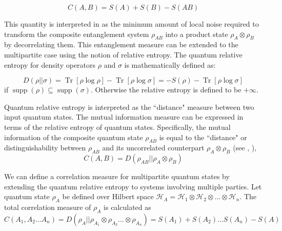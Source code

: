 \documentclass{article}
\DeclareMathOperator{\Tr}{Tr}
\newcommand{\brackets}[1]{\left[ #1 \right]}
\newcommand{\trace}[1]{\Tr \brackets{ #1 }}
\newcommand{\hilb}{\mathcal{H}}
\DeclareMathOperator{\supp}{supp}
\begin{document}
\begin{equation}
\label{eq:total_correlation_bipartite}
C(A, B) = S(A) + S(B) - S(AB)
\end{equation}

This quantity is interpreted in \cite{wintercorrelations} as the minimum amount of local noise required to transform the composite entanglement system $\rho_{AB}$ into a product state $\rho_A \otimes \rho_B$ by decorrelating them. This entanglement measure can be extended to the multipartite case using the notion of relative entropy. The quantum relative entropy for density operators $\rho$ and $\sigma$ is mathematically defined as:

\begin{equation}
\label{eq:relative_entropy}
D(\rho || \sigma) = \trace{\rho \log \rho} - \trace{\rho \log \sigma} = -S(\rho) - \trace{\rho \log \sigma} 
\end{equation}
if $\supp(\rho) \subseteq \supp(\sigma)$. Otherwise the relative entropy is defined to be $+ \infty$.

Quantum relative entropy is interpreted as the ``distance" measure between two input quantum states. The mutual information measure can be expressed in terms of the relative entropy of quantum states. Specifically, the mutual information of the composite quantum state $\rho_{AB}$ is equal to the ``distance" or distinguishability between $\rho_{AB}$ and its uncorrelated counterpart $\rho_A \otimes \rho_B$ (see \cite{vderal1998relativeentropy}, \cite{vedral2002relativeentropy}), 
\begin{equation}
\label{eq:equality_of_RE_total_correlation}
    C(A, B) = D(\rho_{AB} || \rho_A \otimes \rho_B)
\end{equation}

We can define a correlation measure for multipartite quantum states by extending the quantum relative entropy to systems involving multiple parties. Let quantum state $\rho_A$ be defined over Hilbert space $\hilb_A = \hilb_{1} \otimes \hilb_{2} \otimes \ldots \otimes \hilb_{n}$. The total correlation measure of $\rho_A$ is calculated as 
 \begin{equation}
 \label{eq:multipartite_total_correlation}
     C(A_1, A_2 \dots A_n) = D(\rho_{A} || \rho_{A_1} \otimes \rho_{A_2} \dots \otimes  \rho_{A_n}) = S(A_1) + S(A_2) \dots S(A_n) - S(A)
 \end{equation}
\end{document}
